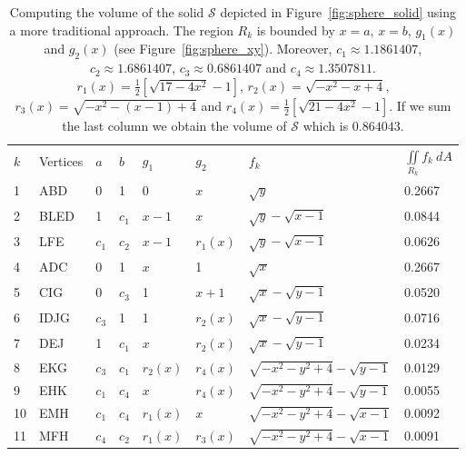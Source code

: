 \documentclass{article}
\theoremstyle{theorem}
\theoremstyle{definition}
\begin{document}
\begin{table}

\caption{Computing the volume of the solid $\mathcal{S}$ depicted in Figure~\ref{fig:sphere_solid} using a more traditional approach. The region $R_k$ is bounded by $x=a$, $x=b$, $g_1(x)$ and $g_2(x)$ (see Figure~\ref{fig:sphere_xy}). Moreover, $c_1 \approx 1.1861407$, $c_2 \approx 1.6861407$, $c_3 \approx 0.6861407$ and $c_4 \approx 1.3507811$. $r_1(x) = \frac{1}{2}[\sqrt{17-4x^2}-1]$,
$r_2(x) = \sqrt{-x^2-x+4}$, $r_3(x) = \sqrt{-x^2-(x-1)+4}$ and $r_4(x) = \frac{1}{2}[\sqrt{21-4x^2}-1]$. If we sum the last column we obtain the volume of $\mathcal{S}$ which is $0.864043$.} 
\label{tab:table1}
\begin{center}

\begin{tabular}{|l l l l l l l l|}
  $k$ & Vertices & $a$ & $b$  & $g_1$ & $g_2$ & $f_k$ & $\iint\limits_{\!R_k} f_k~dA$\\
  1 & ABD & 0 & 1& 0 & $x$ & $\sqrt{y}$ & 0.2667\\
  2 & BLED& 1& $c_1$ & $x-1$ & $x$ & $\sqrt{y} - \sqrt{x-1}$& 0.0844\\
  3 & LFE& $c_1$ & $c_2$ & $x-1$ & $r_1(x)$&$\sqrt{y} - \sqrt{x-1}$&0.0626\\
  4 & ADC& 0 & 1 & $x$ & 1 & $\sqrt{x}$ &0.2667\\
  5 & CIG& 0 & $c_3$ & 1 & $x+1$ & $\sqrt{x} - \sqrt{y-1}$ &0.0520\\
  6 & IDJG& $c_3$ & 1 & 1 & $r_2(x)$ & $\sqrt{x} - \sqrt{y-1}$&0.0716\\
  7 & DEJ& 1& $c_1$& $x$ & $r_2(x)$ & $\sqrt{x} - \sqrt{y-1}$&0.0234\\ 
  8 & EKG& $c_3$& $c_1$& $r_2(x)$ & $r_4(x)$ & $\sqrt{-x^2-y^2+4}-\sqrt{y-1}$&0.0129\\ 
  9 & EHK& $c_1$& $c_4$& $x$& $r_4(x)$ & $\sqrt{-x^2-y^2+4}-\sqrt{y-1}$&0.0055\\
  10& EMH& $c_1$& $c_4$& $r_1(x)$& $x$ & $\sqrt{-x^2-y^2+4}-\sqrt{x-1}$&0.0092\\
  11& MFH& $c_4$& $c_2$& $r_1(x)$& $r_3(x)$ & $\sqrt{-x^2-y^2+4}-\sqrt{x-1}$&0.0091\\ 

\end{tabular}
\end{center}
\end{table}
\end{document}
